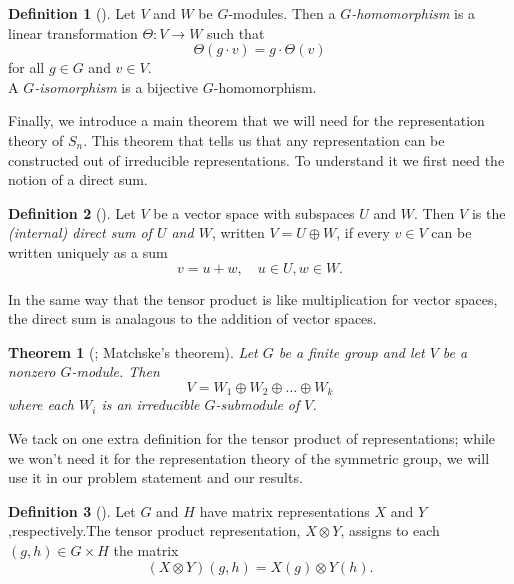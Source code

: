 \documentclass[12pt,twoside]{reedthesis}
\theoremstyle{plain}   %
\newtheorem{thm}{Theorem}[section] %
\theoremstyle{definition}
\newtheorem{defn}{Definition}[section]
\theoremstyle{remark}
\numberwithin{equation}{section}
\begin{document}
  \begin{defn}[{\cite[Definition 1.6.1]{sagan}}]
    Let $V$ and $W$ be $G$-modules. Then a \emph{$G$-homomorphism} is a linear transformation $\Theta: V \to W$ such that
    \[\Theta(g \cdot v) = g \cdot \Theta(v)\]
    for all $g \in G$ and $v \in V$.\\
    A \emph{$G$-isomorphism} is a bijective $G$-homomorphism.
  \end{defn}

  Finally, we introduce a main theorem that we will need for the representation theory of $S_n$.
  This theorem that tells us that any representation can be constructed out of irreducible representations.
  To understand it we first need the notion of a direct sum.
  \begin{defn}[{\cite[Definition 1.5.1]{sagan}}]
    Let $V$ be a vector space with subspaces $U$ and $W$.
    Then $V$ is the \emph{(internal) direct sum of $U$ and $W$}, written $V = U \oplus W$, if every $v \in V$ can be
    written uniquely as a sum
    \[v= u +w, \quad u \in U, w \in W.\]
  \end{defn}
  In the same way that the tensor product is like multiplication for vector spaces, the direct sum is analagous to the addition of vector spaces.
  \begin{thm}[{\cite[Theorem 1.5.3]{sagan}; Matchske's theorem}]
    Let $G$ be a finite group and let $V$ be a nonzero $G$-module. Then
    \[ V = W_1 \oplus W_2 \oplus \dots \oplus W_k\]
    where each $W_i$ is an irreducible $G$-submodule of $V$.
  \end{thm}

  We tack on one extra definition for the tensor product of representations; while we won't need it for the representation theory of the symmetric group,
  we will use it in our problem statement and our results.
  \begin{defn}[{\cite[Definition 1.11.1]{sagan}}]
    Let $G$ and $H$ have matrix representations $X$ and $Y$,respectively.The tensor product representation, $X  \otimes Y$, assigns to each $(g, h) \in G \times H$ the matrix
    \[( X \otimes Y) (g,h) = X(g)  \otimes Y(h). \]
  \end{defn}
\end{document}

